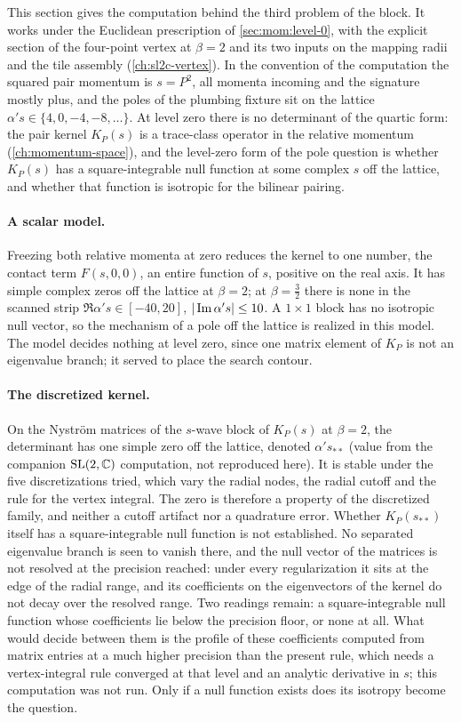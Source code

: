 This section gives the computation behind the third problem of the block.
It works under the Euclidean prescription of \cref{sec:mom:level-0}, with the explicit section of the four-point vertex at $\beta = 2$ and its two inputs on the mapping radii and the tile assembly (\cref{ch:sl2c-vertex}).
In the convention of the computation the squared pair momentum is $s = P^2$, all momenta incoming and the signature mostly plus, and the poles of the plumbing fixture sit on the lattice $\alpha' s \in \{4, 0, -4, -8, \dots\}$.
At level zero there is no determinant of the quartic form: the pair kernel $K_P(s)$ is a trace-class operator in the relative momentum (\cref{ch:momentum-space}), and the level-zero form of the pole question is whether $K_P(s)$ has a square-integrable null function at some complex $s$ off the lattice, and whether that function is isotropic for the bilinear pairing.

\paragraph{A scalar model.}
Freezing both relative momenta at zero reduces the kernel to one number, the contact term $F(s, 0, 0)$, an entire function of $s$, positive on the real axis.
It has simple complex zeros off the lattice at $\beta = 2$; at $\beta = \tfrac{3}{2}$ there is none in the scanned strip $\Re \alpha' s \in [-40, 20]$, ${|\operatorname{Im} \alpha' s|} \le 10$.
A $1 \times 1$ block has no isotropic null vector, so the mechanism of a pole off the lattice is realized in this model.
The model decides nothing at level zero, since one matrix element of $K_P$ is not an eigenvalue branch; it served to place the search contour.

\paragraph{The discretized kernel.}
On the Nyström matrices of the $s$-wave block of $K_P(s)$ at $\beta = 2$, the determinant has one simple zero off the lattice, denoted $\alpha' s_{**}$ (value from the companion $\mathrm{SL}(2, \mathbb{C})$ computation, not reproduced here).
It is stable under the five discretizations tried, which vary the radial nodes, the radial cutoff and the rule for the vertex integral.
The zero is therefore a property of the discretized family, and neither a cutoff artifact nor a quadrature error.
Whether $K_P(s_{**})$ itself has a square-integrable null function is not established.
No separated eigenvalue branch is seen to vanish there, and the null vector of the matrices is not resolved at the precision reached: under every regularization it sits at the edge of the radial range, and its coefficients on the eigenvectors of the kernel do not decay over the resolved range.
Two readings remain: a square-integrable null function whose coefficients lie below the precision floor, or none at all.
What would decide between them is the profile of these coefficients computed from matrix entries at a much higher precision than the present rule, which needs a vertex-integral rule converged at that level and an analytic derivative in $s$; this computation was not run.
Only if a null function exists does its isotropy become the question.

